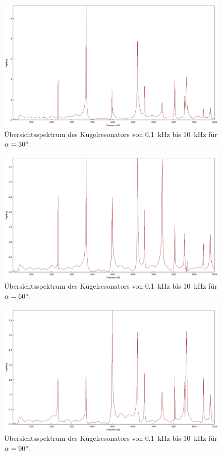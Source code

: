 \begin{figure}
\includegraphics[width=\textwidth]{content/messungen/Chapter2new/2_1_30img.jpg}
\caption{Übersichtsspektrum des Kugelresonators von 0.1~kHz bis 10~kHz für $\alpha=30\degree$.}
\label{fig:2_1_30}
\end{figure}

\begin{figure}
\includegraphics[width=\textwidth]{content/messungen/Chapter2new/2_1_60img.jpg}
\caption{Übersichtsspektrum des Kugelresonators von 0.1~kHz bis 10~kHz für $\alpha=60\degree$.}
\label{fig:2_1_60}
\end{figure}

\begin{figure}
\includegraphics[width=\textwidth]{content/messungen/Chapter2new/2_1_90img.jpg}
\caption{Übersichtsspektrum des Kugelresonators von 0.1~kHz bis 10~kHz für $\alpha=90\degree$.}
\label{fig:2_1_90}
\end{figure}

